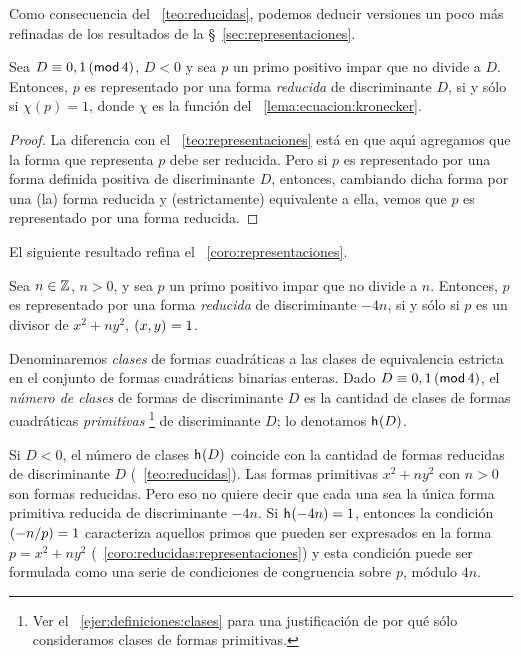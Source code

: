 Como consecuencia del \teoname~\ref{teo:reducidas},
podemos deducir versiones un poco m\'as refinadas de
los resultados de la \S~\ref{sec:representaciones}.

\begin{teoReducidas}\label{teo:reducidas:representaciones}
	Sea $D\equiv 0,1\tmodulo[4]$, $D<0$ y sea $p$ un primo positivo
	impar que no divide a $D$. Entonces, $p$ es representado por
	una forma \emph{reducida} de discriminante $D$,
	si y s\'olo si $\chi(p)=1$, donde $\chi$ es la funci\'on
	del \lemaname~\ref{lema:ecuacion:kronecker}.
\end{teoReducidas}

\begin{proof}
	La diferencia con el \teoname~\ref{teo:representaciones}
	est\'a en que aqu\'{\i} agregamos que la forma que representa
	$p$ debe ser reducida. Pero si $p$ es representado por
	una forma definida positiva de discriminante $D$, entonces,
	cambiando dicha forma por una (la) forma reducida y
	(estrictamente) equivalente a ella, vemos que $p$ es
	representado por una forma reducida.
\end{proof}

El siguiente resultado refina el \coroname~\ref{coro:representaciones}.

\begin{coroReducidas}\label{coro:reducidas:representaciones}
	Sea $n\in\Enteros$, $n>0$, y sea $p$ un primo positivo impar
	que no divide a $n$. Entonces, $p$ es representado por una
	forma \emph{reducida} de discriminante $-4n$, si y s\'olo si
	$p$ es un divisor de $x^2+ny^2$, $\mcd{x,y}=1$.
\end{coroReducidas}

\begin{defReducidas}\label{def:reducidas:numero}
	Denominaremos \emph{clases} de formas cuadr\'aticas a las
	clases de equivalencia estricta en el conjunto de formas
	cuadr\'aticas binarias enteras. Dado $D\equiv 0,1\tmodulo[4]$,
	el \emph{n\'umero de clases} de formas de discriminante $D$
	es la cantidad de clases de formas cuadr\'aticas
	\emph{primitivas}%
	\footnote{
		Ver el \ejername~\ref{ejer:definiciones:clases}
		para una justificaci\'on de por qu\'e s\'olo
		consideramos clases de formas primitivas.
	}
	de discriminante $D$; lo denotamos $\nClases(D)$.
\end{defReducidas}

\begin{obsReducidas}\label{obs:reducidas}
	Si $D<0$, el n\'umero de clases $\nClases(D)$ coincide
	con la cantidad de formas reducidas de discriminante $D$
	(\teoname~\ref{teo:reducidas}).
	Las formas primitivas $x^2+ny^2$ con $n>0$ son formas
	reducidas. Pero eso no quiere decir que cada una sea la
	\'unica forma primitiva reducida de discriminante $-4n$.
	Si $\nClases(-4n)=1$, entonces la condici\'on
	$\tlegendre{-n} p=1$ caracteriza aquellos primos que
	pueden ser expresados en la forma $p=x^2+ny^2$
	(\coroname~\ref{coro:reducidas:representaciones})
	y esta condici\'on puede ser formulada como una serie de
	condiciones de congruencia sobre $p$, m\'odulo $4n$.
\end{obsReducidas}

